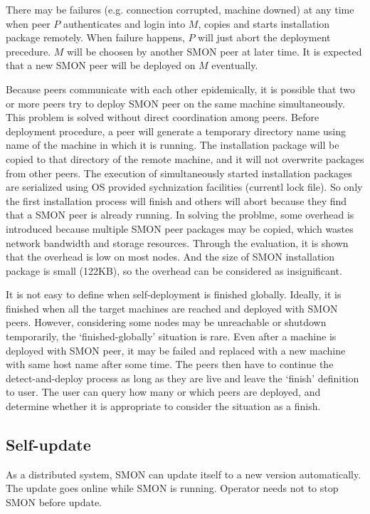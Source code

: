 There may be failures (e.g. connection corrupted, machine
downed) at any time when peer $P$ authenticates and login
into $M$, copies and starts installation package remotely.
When failure happens, $P$ will just abort the deployment
precedure. $M$ will be choosen by another SMON peer at later
time. It is expected that a new SMON peer will be deployed
on $M$ eventually.

Because peers communicate with each other epidemically, it
is possible that two or more peers try to deploy SMON peer
on the same machine simultaneously. This problem is solved
without direct coordination among peers. Before deployment
procedure, a peer will generate a temporary directory name
using name of the machine in which it is running. The
installation package will be copied to that directory of the
remote machine, and it will not overwrite packages from
other peers. The execution of simultaneously started
installation packages are serialized using OS provided
sychnization facilities (currentl lock file). So only the
first installation process will finish and others will abort
because they find that a SMON peer is already running. In
solving the problme, some overhead is introduced because
multiple SMON peer packages may be copied, which wastes
network bandwidth and storage resources. Through the
evaluation, it is shown that the overhead is low on most
nodes. And the size of SMON installation package is small
(122KB), so the overhead can be considered as insignificant.

It is not easy to define when self-deployment is finished
globally. Ideally, it is finished when all the target
machines are reached and deployed with SMON peers.  However,
considering some nodes may be unreachable or shutdown
temporarily, the `finished-globally' situation is rare. Even
after a machine is deployed with SMON peer, it may be failed
and replaced with a new machine with same host name after
some time. The peers then have to continue the
detect-and-deploy process as long as they are live and leave
the `finish' definition to user. The user can query how many
or which peers are deployed, and determine whether it is
appropriate to consider the situation as a finish.

\subsection{Self-update}

As a distributed system, SMON can update itself to a new
version automatically. The update goes online while SMON is
running. Operator needs not to stop SMON before update.

